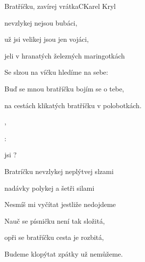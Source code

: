 \setcounter{page}{11}
\begin{song}{Bratříčku, zavírej vrátka}{C}{Karel Kryl}

\begin{SBVerse}

 nevzlykej  nejsou bubáci,

 už jsi velikej  jsou jen vojáci,

jeli v hranatých železných maringotkách

\end{SBVerse}

\begin{SBVerse}

Se slzou na víčku hledíme na sebe:

Buď se mnou bratříčku bojím se o tebe,

na cestách klikatých bratříčku v polobotkách.

\end{SBVerse}

\begin{SBChorus}

    

   ,

    :

 jsi  ?

\end{SBChorus}

\begin{SBVerse}

Bratríčku nevzlykej neplýtvej slzami

nadávky polykej a šetři silami

Nesmíš mi vyčítat jestliže nedojdeme

\end{SBVerse}

\begin{SBVerse}

Nauč se písničku není tak složitá,

opři se bratříčku cesta je rozbitá,

Budeme klopýtat zpátky už nemůžeme.

\end{SBVerse}

\begin{SBChorus}

\end{SBChorus}

\end{song}

\clearpage
